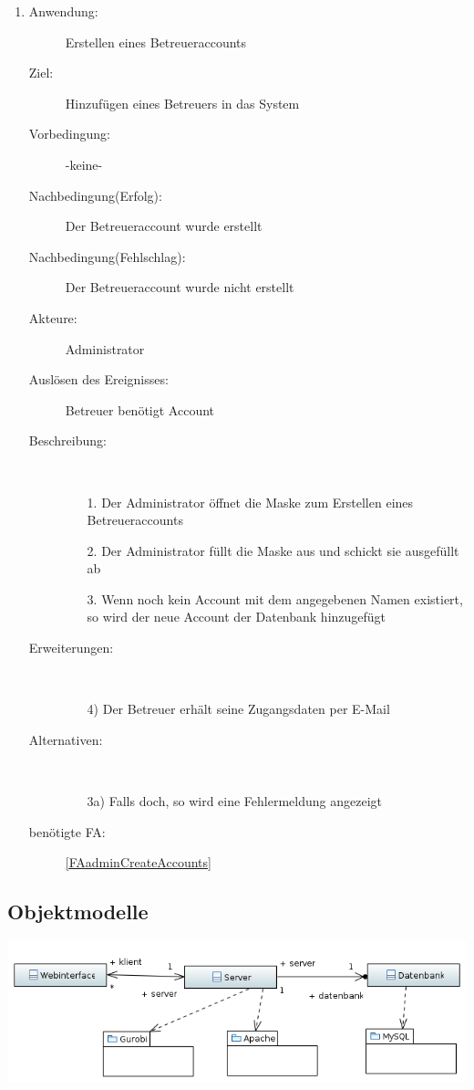 \documentclass[parskip=full]{scrartcl}
\newcommand{\swtLabel}[1]{\textbf{/#1\arabic*0/}}
\begin{document}
\begin{enumerate} [label=\swtLabel{A}]
  
  \item
  \begin{description}
  \item[Anwendung:] Erstellen eines Betreueraccounts
  \item[Ziel:] Hinzufügen eines Betreuers in das System
  	\item[Vorbedingung:] -keine-
  	\item[Nachbedingung(Erfolg):] Der Betreueraccount wurde erstellt
  	\item[Nachbedingung(Fehlschlag):] Der Betreueraccount wurde nicht erstellt
  	\item[Akteure:] Administrator
  	\item[Auslösen des Ereignisses:] Betreuer benötigt Account
  	\item[Beschreibung:]~
  	 \begin{enumerate} 
  	   \item[1.] Der Administrator öffnet die Maske zum Erstellen eines
  	   Betreueraccounts  
  	   \item[2.] Der Administrator füllt die Maske aus und schickt sie ausgefüllt
  	   ab
  	   \item[3.] Wenn noch kein Account mit dem angegebenen Namen existiert, so
  	   wird der neue Account der Datenbank hinzugefügt
  	 \end{enumerate} 
  	\item[Erweiterungen:]~
  	 \begin{enumerate}
  	   \item[4)] Der Betreuer erhält seine Zugangsdaten per E-Mail
  	 \end{enumerate}  
  	\item[Alternativen:] ~
  	 \begin{enumerate}
  	  \item[3a)] Falls doch, so wird eine Fehlermeldung angezeigt
  	 \end{enumerate}  
  	 \item[benötigte FA:] \ref{FAadminCreateAccounts}
  \end{description}
  
\end{enumerate}  
\subsection{Objektmodelle}

\includegraphics[width=\linewidth]{diagramme_pflichtenheft/ClassDiagram.PNG}
\end{document}
